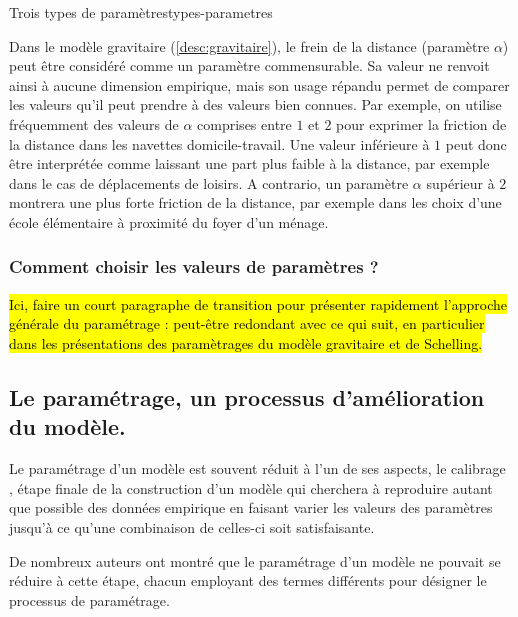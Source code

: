 \documentclass[12pt, a4paper, oneside]{book}
\begin{document}
\begin{encadre}{Trois types de paramètres}{types-parametres}
\begin{description}
			\begin{mdframed}[backgroundcolor=gray!10,footnoteinside=false]
				Dans le modèle gravitaire (\cref{desc:gravitaire}), le frein de la distance (paramètre $\alpha$) peut être considéré comme un paramètre commensurable. Sa valeur ne renvoit ainsi à aucune dimension empirique, mais son usage répandu permet de comparer les valeurs qu'il peut prendre à des valeurs bien connues. Par exemple, on utilise fréquemment des valeurs de $\alpha$ comprises entre $1$ et $2$ pour exprimer la friction de la distance dans les navettes domicile-travail. Une valeur inférieure à $1$ peut donc être interprétée comme laissant une part plus faible à la distance, par exemple dans le cas de déplacements de loisirs. A contrario, un paramètre $\alpha$ supérieur à $2$ montrera une plus forte friction de la distance, par exemple dans les choix d'une école élémentaire à proximité du foyer d'un ménage.
			\end{mdframed}
		\end{description}
	\end{encadre}
	
	
	\subsubsection{Comment choisir les valeurs de paramètres ?}
	
	\hl{Ici, faire un court paragraphe de transition pour présenter rapidement l'approche générale du paramétrage : peut-être redondant avec ce qui suit, en particulier dans les présentations des paramètrages du modèle gravitaire et de Schelling.}
	
	\subsection{Le paramétrage, un processus d'amélioration du modèle.}
	
	Le paramétrage d'un modèle est souvent réduit à l'un de ses aspects, le \og calibrage \fg, étape finale de la construction d'un modèle qui cherchera à reproduire autant que possible des données empirique en faisant varier les valeurs des paramètres jusqu'à ce qu'une combinaison de celles-ci soit satisfaisante.
	
	De nombreux auteurs ont montré que le paramétrage d'un modèle ne pouvait se réduire à cette étape, chacun employant des termes différents pour désigner le processus de paramétrage.
	
\end{document}
